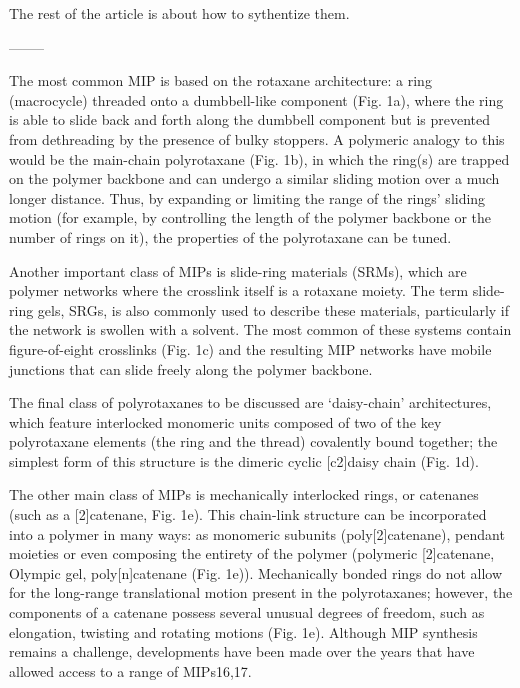 \documentclass[../../main-notes.tex]{subfiles}
\begin{document}
The rest of the article is about how to sythentize them.

--------

\citep{hartMaterialPropertiesApplications2021}


The most common MIP is based on the rotaxane architecture: a ring (macrocycle) threaded onto a dumbbell-like component (Fig. 1a), where the ring is able to slide back and forth along the dumbbell component but is prevented from dethreading by the presence of bulky stoppers. 
A polymeric analogy to this would be the main-chain polyrotaxane (Fig. 1b), in which the ring(s) are trapped on the polymer backbone and can undergo a similar sliding motion over a much longer distance. 
Thus, by expanding or limiting the range of the rings’ sliding motion (for example, by controlling the length of the polymer backbone or the number of rings on it), the properties of the polyrotaxane can be tuned. 

Another important class of MIPs is slide-ring materials (SRMs), which are polymer networks where the crosslink itself is a rotaxane moiety. 
The term slide-ring gels, SRGs, is also commonly used to describe these materials, particularly if the network is swollen with a solvent. 
The most common of these systems contain figure-of-eight crosslinks (Fig. 1c) and the resulting MIP networks have mobile junctions that can slide freely along the polymer backbone. 

The final class of polyrotaxanes to be discussed are ‘daisy-chain’ architectures, which feature interlocked monomeric units composed of two of the key polyrotaxane elements (the ring and the thread) covalently bound together; the simplest form of this structure is the dimeric cyclic [c2]daisy chain (Fig. 1d).

The other main class of MIPs is mechanically interlocked rings, or catenanes (such as a [2]catenane, Fig. 1e). 
This chain-link structure can be incorporated into a polymer in many ways: as monomeric subunits (poly[2]catenane), pendant moieties or even composing the entirety of the polymer (polymeric [2]catenane, Olympic gel, poly[n]catenane (Fig. 1e)). 
Mechanically bonded rings do not allow for the long-range translational motion present in the polyrotaxanes; however, the components of a catenane possess several unusual degrees of freedom, such as elongation, twisting and rotating motions (Fig. 1e). 
Although MIP synthesis remains a challenge, developments have been made over the years that have allowed access to a range of MIPs16,17. 
\end{document}
